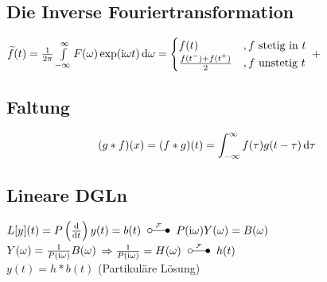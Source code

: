 \documentclass[german,color,5pt]{latex4ei/latex4ei_fs}
\begin{document}
\begin{sectionbox}
	\subsection{Die Inverse Fouriertransformation}
	$\widetilde{f}(t) = \frac{1}{2\pi} \int\limits_{-\infty}^\infty F(\omega) \exp(\i \omega t) \diff \omega = \begin{cases} f(t) &, f \text{ stetig in }t \\ \frac{f(t^-) + f(t^+)}{2} &, f\text{ unstetig }t \end{cases}$
+\end{sectionbox}

\begin{sectionbox}
	
	
	\subsection{Faltung}
	\[(g*f)(x)=(f*g)(t)=\int_{-\infty}^{\infty}f(\tau)g(t-\tau)\diff \tau\]
\end{sectionbox}

\begin{sectionbox}
	\subsection{Lineare DGLn}
	$L[y](t) = P\left(\frac{\diff}{\diff t}\right)y(t) = b(t) \FT P(\i \omega)Y(\omega) = B(\omega)$\\
	$Y(\omega) = \frac{1}{P(\mathrm{i} \omega)}B(\omega)$ \qquad  $\Ra\frac{1}{P(\i\omega)} = H(\omega) \FT h(t)$\\
	$y(t) = h*b(t)$ (Partikuläre Lösung)
\end{sectionbox}
\end{document}
